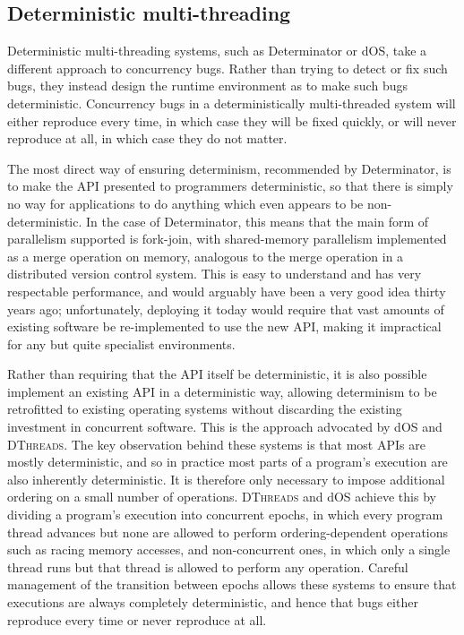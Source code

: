 \subsection{Deterministic multi-threading}

Deterministic multi-threading systems, such as
Determinator\cite{Aviram2010} or dOS\cite{Bergan2010}, take a
different approach to concurrency bugs.  Rather than trying to detect
or fix such bugs, they instead design the runtime environment as to
make such bugs deterministic.  Concurrency bugs in a deterministically
multi-threaded system will either reproduce every time, in which case
they will be fixed quickly, or will never reproduce at all, in which
case they do not matter.

The most direct way of ensuring determinism, recommended by
Determinator, is to make the API presented to programmers
deterministic, so that there is simply no way for applications to do
anything which even appears to be non-deterministic.  In the case of
Determinator, this means that the main form of parallelism supported
is fork-join, with shared-memory parallelism implemented as a merge
operation on memory, analogous to the merge operation in a distributed
version control system\cite{Hamano2013}.  This is easy to understand
and has very respectable performance, and would arguably have been a
very good idea thirty years ago; unfortunately, deploying it today
would require that vast amounts of existing software be re-implemented
to use the new API, making it impractical for any but quite specialist
environments.

Rather than requiring that the API itself be deterministic, it is also
possible implement an existing API in a deterministic way, allowing
determinism to be retrofitted to existing operating systems without
discarding the existing investment in concurrent software.  This is
the approach advocated by dOS\cite{Bergan2010} and
\textsc{DThreads}\cite{Liu2011}.  The key observation behind these
systems is that most APIs are mostly deterministic, and so in practice
most parts of a program's execution are also inherently deterministic.
It is therefore only necessary to impose additional ordering on a
small number of operations.  \textsc{DThreads} and dOS achieve this by
dividing a program's execution into concurrent epochs, in which every
program thread advances but none are allowed to perform
ordering-dependent operations such as racing memory accesses, and
non-concurrent ones, in which only a single thread runs but that
thread is allowed to perform any operation.  Careful management of the
transition between epochs allows these systems to ensure that
executions are always completely deterministic, and hence that bugs
either reproduce every time or never reproduce at all.

